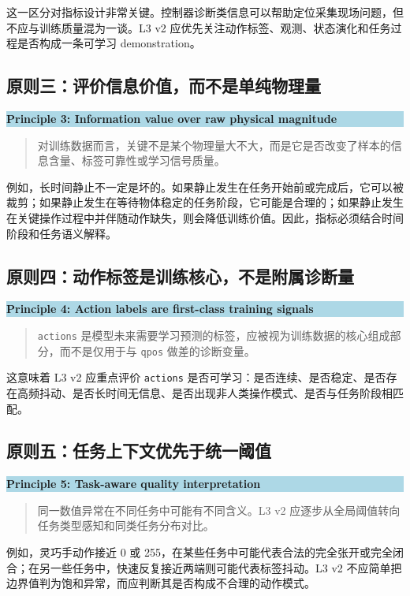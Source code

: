 \documentclass[UTF8,zihao=-4,oneside,openany]{ctexrep}
\newenvironment{principlebox}[1]{\vspace{0.5em}\noindent\colorbox{LightBlue}{\parbox{0.96\linewidth}{\textbf{#1}}}\par\vspace{-0.2em}\begin{quote}\small}{\end{quote}\vspace{0.3em}}
\begin{document}
这一区分对指标设计非常关键。控制器诊断类信息可以帮助定位采集现场问题，但不应与训练质量混为一谈。L3 v2 应优先关注动作标签、观测、状态演化和任务过程是否构成一条可学习 demonstration。

\subsection{原则三：评价信息价值，而不是单纯物理量}

\begin{principlebox}{Principle 3: Information value over raw physical magnitude}
对训练数据而言，关键不是某个物理量大不大，而是它是否改变了样本的信息含量、标签可靠性或学习信号质量。
\end{principlebox}

例如，长时间静止不一定是坏的。如果静止发生在任务开始前或完成后，它可以被裁剪；如果静止发生在等待物体稳定的任务阶段，它可能是合理的；如果静止发生在关键操作过程中并伴随动作缺失，则会降低训练价值。因此，指标必须结合时间阶段和任务语义解释。

\subsection{原则四：动作标签是训练核心，不是附属诊断量}

\begin{principlebox}{Principle 4: Action labels are first-class training signals}
\texttt{actions} 是模型未来需要学习预测的标签，应被视为训练数据的核心组成部分，而不是仅用于与 \texttt{qpos} 做差的诊断变量。
\end{principlebox}

这意味着 L3 v2 应重点评价 \texttt{actions} 是否可学习：是否连续、是否稳定、是否存在高频抖动、是否长时间无信息、是否出现非人类操作模式、是否与任务阶段相匹配。

\subsection{原则五：任务上下文优先于统一阈值}

\begin{principlebox}{Principle 5: Task-aware quality interpretation}
同一数值异常在不同任务中可能有不同含义。L3 v2 应逐步从全局阈值转向任务类型感知和同类任务分布对比。
\end{principlebox}

例如，灵巧手动作接近 0 或 255，在某些任务中可能代表合法的完全张开或完全闭合；在另一些任务中，快速反复接近两端则可能代表标签抖动。L3 v2 不应简单把边界值判为饱和异常，而应判断其是否构成不合理的动作模式。
\end{document}
